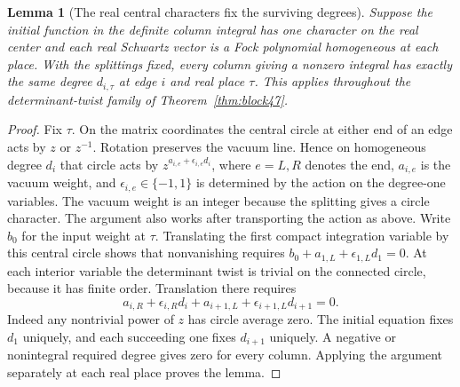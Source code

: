 \documentclass[a4paper,11pt]{article}
\newtheorem{lemma}[proposition]{Lemma}
\theoremstyle{definition}
\theoremstyle{remark}
\numberwithin{equation}{section}
\begin{document}
\begin{lemma}[The real central characters fix the surviving degrees]
\label{lem:degrees242}
Suppose the initial function in the definite column integral has
one character on the real center and each real Schwartz vector is
a Fock polynomial homogeneous at each place. With the splittings
fixed, every column giving a nonzero integral has exactly the same
degree \(d_{i,\tau}\) at edge \(i\) and real place \(\tau\).
This applies throughout the determinant-twist family of
Theorem~\ref{thm:block47}.
\end{lemma}
\begin{proof}
Fix \(\tau\). On the matrix coordinates the central circle at
either end of an edge acts by \(z\) or \(z^{-1}\). Rotation
preserves the vacuum line. Hence on homogeneous degree \(d_i\)
that circle acts by \(z^{a_{i,e}+\epsilon_{i,e}d_i}\), where
\(e=L,R\) denotes the end, \(a_{i,e}\) is the vacuum weight,
and \(\epsilon_{i,e}\in\{-1,1\}\) is determined by the
action on the degree-one variables. The vacuum weight is an
integer because the splitting gives a circle character. The
argument also works after transporting the action as above.
Write \(b_0\) for the input weight at \(\tau\). Translating
the first compact integration variable by this central circle
shows that nonvanishing requires
\(b_0+a_{1,L}+\epsilon_{1,L}d_1=0\).
At each interior variable the determinant twist is trivial on
the connected circle, because it has finite order. Translation
there requires
\[
 a_{i,R}+\epsilon_{i,R}d_i+
 a_{i+1,L}+\epsilon_{i+1,L}d_{i+1}=0 .
\]
Indeed any nontrivial power of \(z\) has circle average zero.
The initial equation fixes \(d_1\) uniquely, and each succeeding
one fixes \(d_{i+1}\) uniquely. A negative or nonintegral
required degree gives zero for every column. Applying the
argument separately at each real place proves the lemma.
\end{proof}
\end{document}
